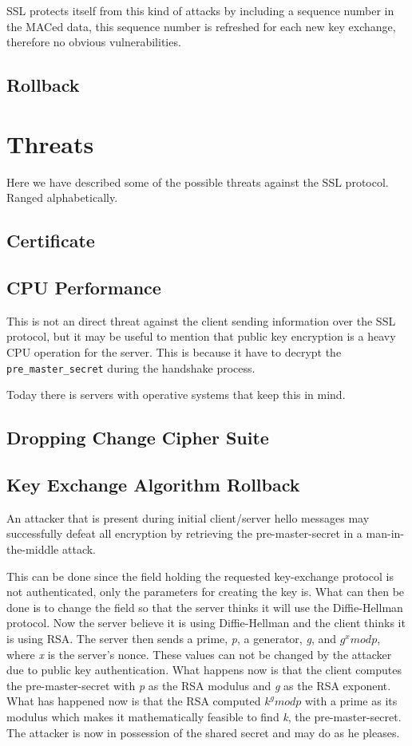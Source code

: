 \documentclass[11pt,a4paper, twocolumn]{article}
\begin{document}
SSL protects itself from this kind of attacks by including a sequence number in the MACed data, this sequence number is refreshed for each new key exchange, therefore no obvious vulnerabilities.

\subsection{Rollback}

\section{Threats}
Here we have described some of the possible threats against the SSL protocol. Ranged alphabetically.

\subsection{Certificate}
\subsection{CPU Performance}
This is not an direct threat against the client sending information over the SSL protocol, but it may be useful to mention that public key encryption is a heavy CPU operation for the server. This is because it have to decrypt the \texttt{pre\_master\_secret} during the handshake process. 

Today there is servers with operative systems that keep this in mind.
\subsection{Dropping Change Cipher Suite}

\subsection{Key Exchange Algorithm Rollback}
An attacker that is present during initial client/server hello messages may successfully defeat all encryption by retrieving the pre-master-secret in a man-in-the-middle attack.

This can be done since the field holding the requested key-exchange protocol is not authenticated, only the parameters for creating the key is. What can then be done is to change the field so that the server thinks it will use the Diffie-Hellman protocol. Now the server believe it is using Diffie-Hellman and the client thinks it is using RSA. The server then sends a prime, \textit{p}, a generator, \textit{g}, and $ g^{x} mod p $, where \textit{x} is the server's nonce. These values can not be changed by the attacker due to public key authentication. What happens now is that the client computes the pre-master-secret with \textit{p} as the RSA modulus and \textit{g} as the RSA exponent. What has happened now is that the RSA computed $k^{g} mod p$ with a prime as its modulus which makes it mathematically feasible to find \textit{k}, the pre-master-secret. The attacker is now in possession of the shared secret and may do as he pleases. 
\end{document}
